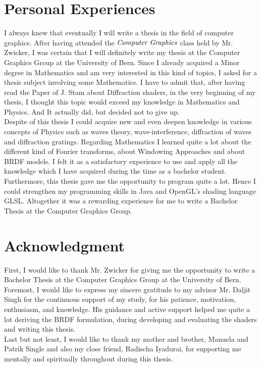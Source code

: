 \section{Personal Experiences}
I always knew that eventually I will write a thesis in the field of computer graphics. After having attended the $\emph{Computer Graphics}$ class held by Mr. Zwicker, I was certain that I will definitely write my thesis at the Computer Graphics Group at the University of Bern. Since I already acquired a Minor degree in Mathematics and am very interested in this kind of topics, I asked for a thesis subject involving some Mathematics. I have to admit that, after having read the Paper of J. Stam about Diffraction shaders, in the very beginning of my thesis, I thought this topic would exceed my knowledge in Mathematics and Physics. And It actually did, but decided not to give up. \\

Despite of this thesis I could acquire new and even deepen knowledge in various concepts of Physics such as waves theory, wave-interference, diffraction of waves and diffraction gratings. Regarding Mathematics I learned quite a lot about the different kind of Fourier transforms, about Windowing Approaches and about BRDF models. I felt it as a satisfactory experience to use and apply all the knowledge which I have acquired during the time as a bachelor student. Furthermore, this thesis gave me the opportunity to program quite a lot. Hence I could strengthen my programming skills in Java and OpenGL's shading language GLSL. Altogether it was a rewarding experience for me to write a Bachelor Thesis at the Computer Graphics Group.

\section{Acknowledgment}
First, I would like to thank Mr. Zwicker for giving me the opportunity to write a Bachelor Thesis at the Computer Graphics Group at the University of Bern. \\

Foremost, I would like to express my sincere gratitude to my advisor Mr. Daljit Singh for the continuous support of my study, for his patience, motivation, enthusiasm, and knowledge. His guidance and active support helped me quite a lot deriving the BRDF formulation, during developing and evaluating the shaders and writing this thesis. \\
  
Last but not least, I would like to thank my mother and brother, Manuela and Patrik Single and also my close friend, Radischa Iyadurai, for supporting me mentally and spiritually throughout during this thesis.
